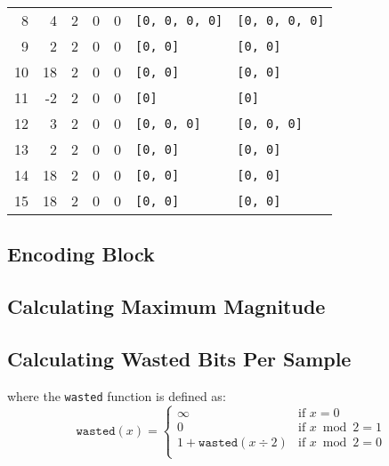 \begin{landscape}
\begin{algorithm}
{{{{\begin{tabular}{r|rrrrll}
8 & 4 & 2 & 0 & 0 & \texttt{[0, 0, 0, 0]} & \texttt{[0, 0, 0, 0]} \\
9 & 2 & 2 & 0 & 0 & \texttt{[0, 0]} & \texttt{[0, 0]} \\
10 & 18 & 2 & 0 & 0 & \texttt{[0, 0]} & \texttt{[0, 0]} \\
11 & -2 & 2 & 0 & 0 & \texttt{[0]} & \texttt{[0]} \\
12 & 3 & 2 & 0 & 0 & \texttt{[0, 0, 0]} & \texttt{[0, 0, 0]} \\
13 & 2 & 2 & 0 & 0 & \texttt{[0, 0]} & \texttt{[0, 0]} \\
14 & 18 & 2 & 0 & 0 & \texttt{[0, 0]} & \texttt{[0, 0]} \\
15 & 18 & 2 & 0 & 0 & \texttt{[0, 0]} & \texttt{[0, 0]} \\
\end{tabular}
}}}}
\end{algorithm}

\end{landscape}

\subsection{Encoding Block}
\label{wavpack:encode_block}
{
  
}

\clearpage

\subsection{Calculating Maximum Magnitude}
\label{wavpack:calc_maximum_magnitude}
{
  
}

\subsection{Calculating Wasted Bits Per Sample}
\label{wavpack:calc_wasted_bps}
{
  
where the \texttt{wasted} function is defined as:
\begin{equation*}
\texttt{wasted}(x) =
\begin{cases}
\infty & \text{if } x = 0 \\
0 & \text{if } x \bmod 2 = 1 \\
1 + \texttt{wasted}(x \div 2) & \text{if } x \bmod 2 = 0 \\
\end{cases}
\end{equation*}
}


